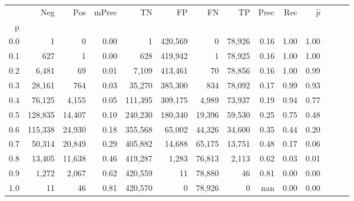 \begin{tabular}{rrrrrrrrrrrrrr}
\toprule
{} &      Neg &     Pos & mPrec &       TN &       FP &      FN &      TP &  Prec &   Rec & $\hat{p}$ \\
p   &          &         &       &          &          &         &         &       &       &           \\
\midrule
0.0 &        1 &       0 &  0.00 &        1 &  420,569 &       0 &  78,926 &  0.16 &  1.00 &      1.00 \\
0.1 &      627 &       1 &  0.00 &      628 &  419,942 &       1 &  78,925 &  0.16 &  1.00 &      1.00 \\
0.2 &    6,481 &      69 &  0.01 &    7,109 &  413,461 &      70 &  78,856 &  0.16 &  1.00 &      0.99 \\
0.3 &   28,161 &     764 &  0.03 &   35,270 &  385,300 &     834 &  78,092 &  0.17 &  0.99 &      0.93 \\
0.4 &   76,125 &   4,155 &  0.05 &  111,395 &  309,175 &   4,989 &  73,937 &  0.19 &  0.94 &      0.77 \\
0.5 &  128,835 &  14,407 &  0.10 &  240,230 &  180,340 &  19,396 &  59,530 &  0.25 &  0.75 &      0.48 \\
0.6 &  115,338 &  24,930 &  0.18 &  355,568 &   65,002 &  44,326 &  34,600 &  0.35 &  0.44 &      0.20 \\
0.7 &   50,314 &  20,849 &  0.29 &  405,882 &   14,688 &  65,175 &  13,751 &  0.48 &  0.17 &      0.06 \\
0.8 &   13,405 &  11,638 &  0.46 &  419,287 &    1,283 &  76,813 &   2,113 &  0.62 &  0.03 &      0.01 \\
0.9 &    1,272 &   2,067 &  0.62 &  420,559 &       11 &  78,880 &      46 &  0.81 &  0.00 &      0.00 \\
1.0 &       11 &      46 &  0.81 &  420,570 &        0 &  78,926 &       0 &   nan &  0.00 &      0.00 \\
\bottomrule
\end{tabular}
